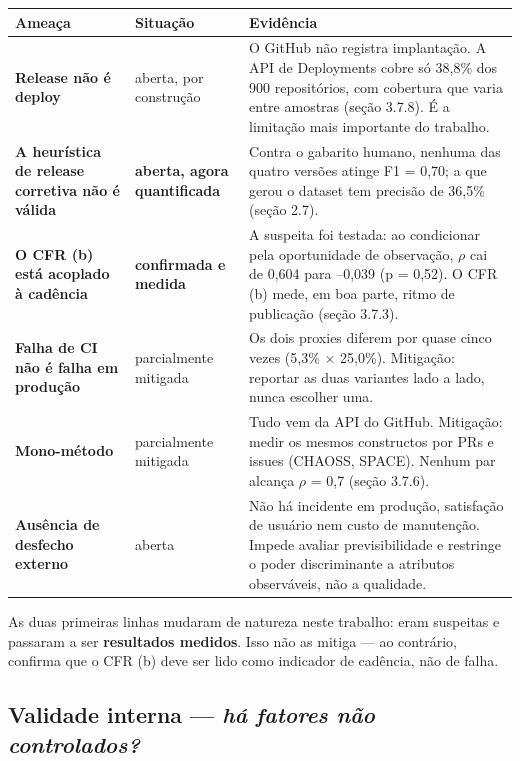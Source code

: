 \documentclass[12pt]{article}
\begin{document}
\begin{table}[!htbp]
\centering
\scriptsize
\begin{tabular}{p{}p{}p{}}
\toprule
\textbf{Ameaça} & \textbf{Situação} & \textbf{Evidência} \\
\midrule
\textbf{Release não é deploy} & aberta, por construção & O GitHub não registra implantação. A API de Deployments cobre só 38,8\% dos 900 repositórios, com cobertura que varia entre amostras (seção 3.7.8). É a limitação mais importante do trabalho. \\
\textbf{A heurística de release corretiva não é válida} & \textbf{aberta, agora quantificada} & Contra o gabarito humano, nenhuma das quatro versões atinge F1 = 0,70; a que gerou o dataset tem precisão de 36,5\% (seção 2.7). \\
\textbf{O CFR (b) está acoplado à cadência} & \textbf{confirmada e medida} & A suspeita foi testada: ao condicionar pela oportunidade de observação, $\rho$ cai de 0,604 para --0,039 (p = 0,52). O CFR (b) mede, em boa parte, ritmo de publicação (seção 3.7.3). \\
\textbf{Falha de CI não é falha em produção} & parcialmente mitigada & Os dois proxies diferem por quase cinco vezes (5,3\% $\times$ 25,0\%). Mitigação: reportar as duas variantes lado a lado, nunca escolher uma. \\
\textbf{Mono-método} & parcialmente mitigada & Tudo vem da API do GitHub. Mitigação: medir os mesmos constructos por PRs e issues (CHAOSS, SPACE). Nenhum par alcança $\rho$ = 0,7 (seção 3.7.6). \\
\textbf{Ausência de desfecho externo} & aberta & Não há incidente em produção, satisfação de usuário nem custo de manutenção. Impede avaliar previsibilidade e restringe o poder discriminante a atributos observáveis, não a qualidade. \\
\bottomrule
\end{tabular}
\end{table}

As duas primeiras linhas mudaram de natureza neste trabalho: eram suspeitas e passaram a ser \textbf{resultados medidos}. Isso não as mitiga — ao contrário, confirma que o CFR (b) deve ser lido como indicador de cadência, não de falha.

\subsection{Validade interna — \emph{há fatores não controlados?}}
\end{document}
